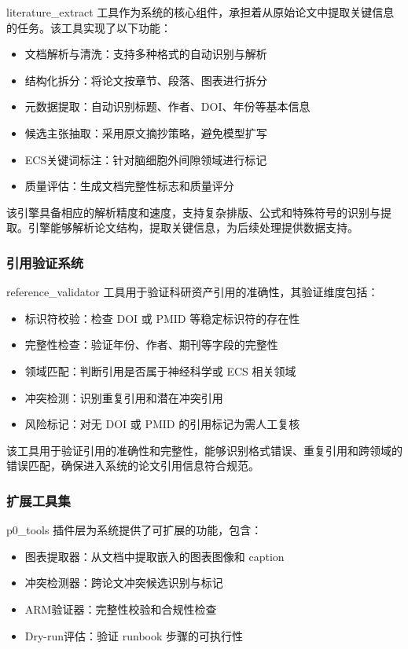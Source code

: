 ﻿\documentclass[a4paper,12pt]{article}
\begin{document}
literature\_extract 工具作为系统的核心组件，承担着从原始论文中提取关键信息的任务。该工具实现了以下功能：

\begin{itemize}
    \item 文档解析与清洗：支持多种格式的自动识别与解析
    \item 结构化拆分：将论文按章节、段落、图表进行拆分
    \item 元数据提取：自动识别标题、作者、DOI、年份等基本信息
    \item 候选主张抽取：采用原文摘抄策略，避免模型扩写
    \item ECS关键词标注：针对脑细胞外间隙领域进行标记
    \item 质量评估：生成文档完整性标志和质量评分
\end{itemize}

该引擎具备相应的解析精度和速度，支持复杂排版、公式和特殊符号的识别与提取。引擎能够解析论文结构，提取关键信息，为后续处理提供数据支持。

\subsubsection{引用验证系统}

reference\_validator 工具用于验证科研资产引用的准确性，其验证维度包括：

\begin{itemize}
    \item 标识符校验：检查 DOI 或 PMID 等稳定标识符的存在性
    \item 完整性检查：验证年份、作者、期刊等字段的完整性
    \item 领域匹配：判断引用是否属于神经科学或 ECS 相关领域
    \item 冲突检测：识别重复引用和潜在冲突引用
    \item 风险标记：对无 DOI 或 PMID 的引用标记为需人工复核
\end{itemize}

该工具用于验证引用的准确性和完整性，能够识别格式错误、重复引用和跨领域的错误匹配，确保进入系统的论文引用信息符合规范。

\subsubsection{扩展工具集}

p0\_tools 插件层为系统提供了可扩展的功能，包含：

\begin{itemize}
    \item 图表提取器：从文档中提取嵌入的图表图像和 caption
    \item 冲突检测器：跨论文冲突候选识别与标记
    \item ARM验证器：完整性校验和合规性检查
    \item Dry-run评估：验证 runbook 步骤的可执行性
\end{itemize}
\end{document}
